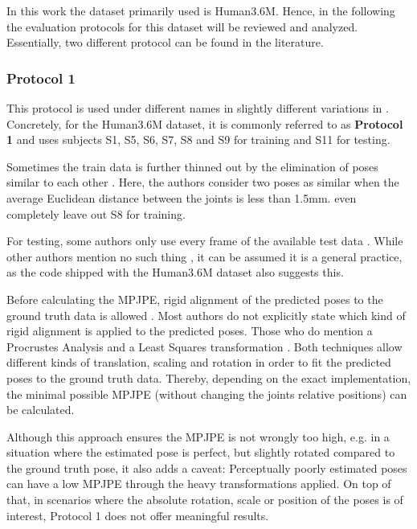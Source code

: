 In this work the dataset primarily used is Human3.6M.
Hence, in the following the evaluation protocols for this dataset will be reviewed and analyzed.
Essentially, two different protocol can be found in the literature.

\subsubsection{Protocol 1}

This protocol is used under different names in slightly different variations in \cite{sun17, drover18, moreno-noguer16, yasin16, kostrikov14, tome17}.
Concretely, for the Human3.6M dataset, it is commonly referred to as \textbf{Protocol 1} and uses subjects S1, S5, S6, S7, S8 and S9 for training and S11 for testing.

Sometimes the train data is further thinned out by the elimination of poses similar to each other \cite{yasin16}.
Here, the authors consider two poses as similar when the average Euclidean distance between the joints is less than 1.5mm.
\citet{drover18} even completely leave out S8 for training.

For testing, some authors only use every  frame of the available test data \cite{sun17, chen17, yasin16, moreno-noguer16, tome17}.
While other authors mention no such thing \cite{drover18, kostrikov14}, it can be assumed it is a general practice, as the code shipped with the Human3.6M dataset also suggests this.

Before calculating the MPJPE, rigid alignment of the predicted poses to the ground truth data is allowed  \cite{drover18, yasin16, kostrikov14, sun17, tome17, chen17}.
Most authors do not explicitly state which kind of rigid alignment is applied to the predicted poses.
Those who do mention a Procrustes Analysis \cite{sun17, tome17} and a Least Squares transformation \cite{kostrikov14}.
Both techniques allow different kinds of translation, scaling and rotation in order to fit the predicted poses to the ground truth data.
Thereby, depending on the exact implementation, the minimal possible MPJPE (without changing the joints relative positions) can be calculated.

Although this approach ensures the MPJPE is not wrongly too high, e.g. in a situation where the estimated pose is perfect, but slightly rotated compared to the ground truth pose, it also adds a caveat:
Perceptually poorly estimated poses can have a low MPJPE through the heavy transformations applied.
On top of that, in scenarios where the absolute rotation, scale or position of the poses is of interest, Protocol 1 does not offer meaningful results.

